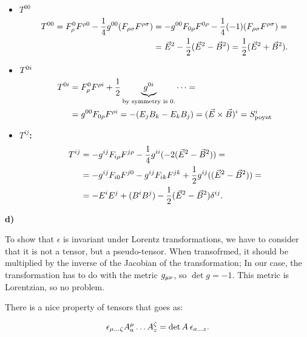 \begin{itemize}
	\item \textbf{$T^{00}$}\\
	\begin{equation}
		\begin{split}
		T^{00 }= F^{0}_{\rho}F^{\rho 0 } - \frac{1}{4} g^{00 }(F_{\rho\sigma }F^{\rho\sigma }) &= -g^{00 }F_{0\rho }F^{0\rho } - \frac{1}{4}(-1)(F_{\rho\sigma }F^{\rho\sigma }) =\\
		 &=\vec{E}^{2} - \frac{1}{2}(\vec{E}^{2}- \vec{B}^{2}) = \frac{1}{2} (\vec{E}^{2} + \vec{B}^{2}).
		\end{split}
	\end{equation}
	\item \textbf{$T^{0i }$}\\
	\begin{equation}
		\begin{split}
				T^{0i } &= F^{0}_{\rho}F^{\rho i } + \frac{1}{2}\underbrace{g^{0i }}_{\text{by symmetry is 0.}} \dots =\\
				&= g^{00 }F_{0\rho }F^{\rho i } = - (E_{j}B_{k} - E_{k}B_{j}) = (\vec{E} \times \vec{B})^{i} = S_{\mathrm{poynt}}^{i}
		\end{split}
	\end{equation}
	\item \textbf{$T^{ij}$:}\\
	\begin{equation}
		\begin{split}
			T^{ij } &= -g^{ij } F_{i\rho }F^{j \rho  } - \frac{1}{4} g^{ii } (-2 (\vec{E}^{2}-\vec{B}^{2}))=\\
			&= -g^{ij } F_{i 0 }F^{j 0 } -g^{ij } F_{i k }F^{j k } + \frac{1}{2} g^{ij } ((\vec{E}^{2}-\vec{B}^{2}))=\\
			&= - E^{i}E^{j}+(B^{i} B^{j}) - \frac{1}{2} (\vec{E}^{2}-\vec{B}^{2})\delta^{ij}.
		\end{split}
	\end{equation}	
\end{itemize}

\textbf{d)}

To show that $\epsilon$ is invariant under Lorentz transformations, we have to consider that it is not a tensor, but a pseudo-tensor. When transofrmed, it should be multiplied by the inverse of the Jacobian of the transformation; In our case, the transformation has to do with the metric $g_{\mu\nu }$, so $\det g = -1$. This metric is Lorentzian, so no problem.

There is a nice property of tensors that goes as:

\begin{equation}
	\epsilon_{\mu \dots \zeta} A^{\mu}_{a} \dots A^{\zeta}_{z} = \det A \: \epsilon_{a \dots z}.
\end{equation}

